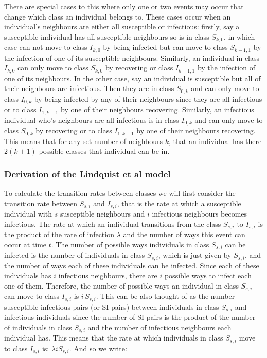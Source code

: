 \documentclass{uonmathsreport}
\begin{document}
There are special cases to this where only one or two events may occur that change which class an individual belongs to. These cases occur when an individual's neighbours are either all susceptible or infectious: firstly, say a susceptible individual has all susceptible neighbours so is in class $S_{k,0}$, in which case can not move to class $I_{k,0}$ by being infected but can move to class $S_{k-1,1}$ by the infection of one of its susceptible neighbours. Similarly, an individual in class $I_{k,0}$ can only move to class $S_{k,0}$ by recovering or class $I_{k-1,1}$ by the infection of one of its neighbours. In the other case, say an individual is susceptible but all of their neighbours are infectious. Then they are in class $S_{0,k}$ and can only move to class $I_{0,k}$ by being infected by any of their neighbours since they are all infectious or to class $I_{1,k-1}$ by one of their neighbours recovering. Similarly, an infectious individual who's neighbours are all infectious is in class $I_{0,k}$ and can only move to class $S_{0,k}$ by recovering or to class $I_{1,k-1}$ by one of their neighbours recovering. This means that for any set number of neighbours $k$, that an individual has there $2(k+1)$ possible classes that individual can be in.

\subsubsection{Derivation of the Lindquist et al model} \label{subsub:6.2.2}

To calculate the transition rates between classes we will first consider the transition rate between $S_{s,i}$ and $I_{s,i}$, that is the rate at which a susceptible individual with $s$ susceptible neighbours and $i$ infectious neighbours becomes infectious. The rate at which an individual transitions from the class $S_{s,i}$ to $I_{s,i}$ is the product of the rate of infection $\lambda$ and the number of ways this event can occur at time $t$. The number of possible ways individuals in class $S_{s,i}$ can be infected is the number of individuals in class $S_{s,i}$, which is just given by $S_{s,i}$, and the number of ways each of these individuals can be infected. Since each of these individuals has $i$ infectious neighbours, there are $i$ possible ways to infect each one of them. Therefore, the number of possible ways an individual in class $S_{s,i}$ can move to class $I_{s,i}$ is $i\,S_{s,i}$. This can be also thought of as the number susceptible-infectious pairs (or SI pairs) between individuals in class $S_{s,i}$ and infectious individuals since the number of SI pairs is the product of the number of individuals in class $S_{s,i}$ and the number of infectious neighbours each individual has. This means that the rate at which individuals in class $S_{s,i}$ move to class $I_{s,i}$ is: $\lambda iS_{s,i}$. And so we write:
\end{document}
